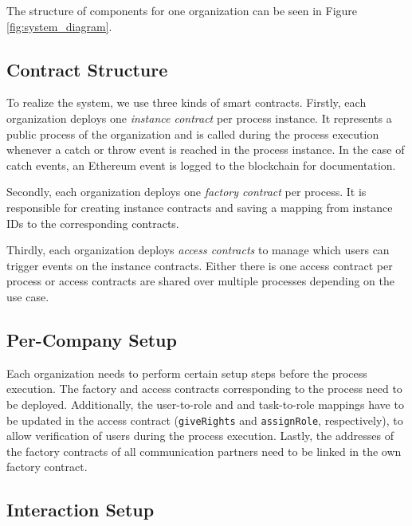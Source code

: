 \documentclass[runningheads]{llncs}
\begin{document}
The structure of components for one organization can be seen in Figure \ref{fig:system_diagram}.

\subsection{Contract Structure}

To realize the system, we use three kinds of smart contracts.
Firstly, each organization deploys one \emph{instance contract} per process instance.
It represents a public process of the organization and is called during the process execution whenever a catch or throw event is reached in the process instance.
In the case of catch events, an Ethereum event is logged to the blockchain for documentation.

Secondly, each organization deploys one \emph{factory contract} per process.
It is responsible for creating instance contracts and saving a mapping from instance IDs to the corresponding contracts.

Thirdly, each organization deploys \emph{access contracts} to manage which users can trigger events on the instance contracts.
Either there is one access contract per process or access contracts are shared over multiple processes depending on the use case.

\subsection{Per-Company Setup}

Each organization needs to perform certain setup steps before the process execution.
The factory and access contracts corresponding to the process need to be deployed.
Additionally, the user-to-role and and task-to-role mappings have to be updated in the access contract (\texttt{giveRights} and \texttt{assignRole}, respectively), to allow verification of users during the process execution.
Lastly, the addresses of the factory contracts of all communication partners need to be linked in the own factory contract.

\subsection{Interaction Setup}
\end{document}
